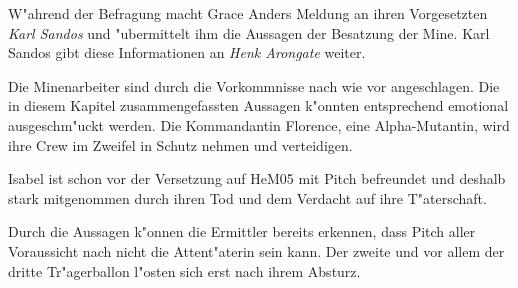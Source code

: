 W"ahrend der Befragung macht Grace Anders Meldung an ihren Vorgesetzten \emph{Karl Sandos} und "ubermittelt ihm die Aussagen der Besatzung der Mine. Karl Sandos gibt diese Informationen an \emph{Henk Arongate} weiter.

\begin{remarks}
	Die Minenarbeiter sind durch die Vorkommnisse nach wie vor angeschlagen. Die in diesem Kapitel zusammengefassten Aussagen k"onnten entsprechend emotional ausgeschm"uckt werden. Die Kommandantin Florence, eine Alpha-Mutantin, wird ihre Crew im Zweifel in Schutz nehmen und verteidigen.

	Isabel ist schon vor der Versetzung auf HeM05 mit Pitch befreundet und deshalb stark mitgenommen durch ihren Tod und dem Verdacht auf ihre T"aterschaft.

	Durch die Aussagen k"onnen die Ermittler bereits erkennen, dass Pitch aller Voraussicht nach nicht die Attent"aterin sein kann. Der zweite und vor allem der dritte Tr"agerballon l"osten sich erst nach ihrem Absturz.		
\end{remarks}
